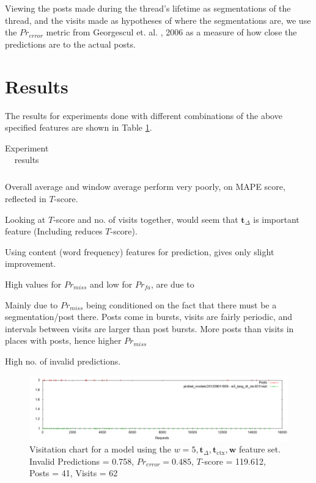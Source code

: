 \documentclass[12 pt]{article}
\begin{document}
Viewing the posts made during the thread's lifetime as segmentations of the thread, and the visits made as hypotheses of where the segmentations are, we use the $Pr_{error}$ metric from Georgescul et. al. , 2006 as a measure of how close the predictions are to the actual posts.





\section{Results}

The results for experiments done with different combinations of the above specified features are shown in Table \ref{expt1}.
\begin{table}
	\footnotesize
	\begin{centering}
	\begin{tabular}{|l|c|c|c|c|c|c|c|c|}
	\hline
	
	\hline
	\end{tabular}
	\caption{Experiment results}
	\label{expt1}
\end{centering}
\end{table}

Overall average and window average perform very poorly, on MAPE score, reflected in $T$-score.

Looking at $T$-score and no. of visits together, would seem that $\textbf{t}_\Delta$ is important feature (Including reduces $T$-score).

Using content (word frequency) features for prediction, gives only slight improvement.

High values for $Pr_{miss}$ and low for $Pr_{fa}$, are due to

	Mainly due to $Pr_{miss}$ being conditioned on the fact that there must be a segmentation/post there.
	Posts come in bursts, visits are fairly periodic, and intervals between visits are larger than post bursts.
	More posts than visits in places with posts, hence higher $Pr_{miss}$

	High no. of invalid predictions.
\begin{landscape}
\begin{figure}
	\centering
	\includegraphics[scale=0.5]{example_seq.png}
	\caption{Visitation chart for a model using the $w=5, \mathbf{t}_\Delta, \mathbf{t}_{\text{ctx}},\mathbf{w}$ feature set. Invalid Predictions = 0.758, $Pr_{error} =  0.485$, $T$-score = 119.612, Posts = 41, Visits = 62}
\end{figure}
\end{landscape}




\end{document}
